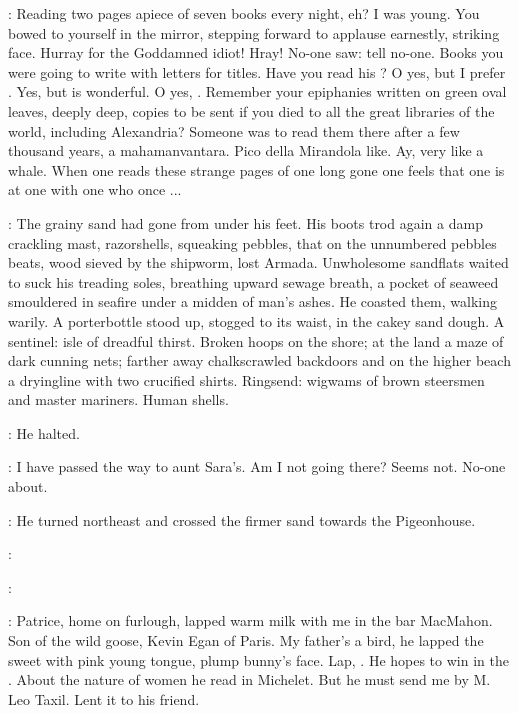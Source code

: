 \StephenInt:
Reading two pages apiece of seven books every night, eh?
I was young.
You bowed to yourself in the mirror,
stepping forward to applause earnestly, striking face.
Hurray for the Goddamned idiot!
Hray!
No-one saw:
tell no-one.
Books you were going to write with letters for titles.
Have you read his ?
O yes, but I prefer .
Yes, but  is wonderful.
O yes, .
Remember your epiphanies written on green oval leaves,
deeply deep,
copies to be sent if you died to all the great libraries of the world,
including Alexandria?
Someone was to read them there after a few thousand years,
a mahamanvantara.
Pico della Mirandola like.
Ay, very like a whale.
When one reads these strange pages of one long gone
one feels that one is at one with one who once ...

:
The grainy sand had gone from under his feet.
His boots trod again a damp crackling mast,
razorshells, squeaking pebbles,
that on the unnumbered pebbles beats,
wood sieved by the shipworm,
lost Armada.
Unwholesome sandflats waited to suck his treading soles,
breathing upward sewage breath,
a pocket of seaweed smouldered in seafire under a midden of man's ashes.
He coasted them, walking warily.
A porterbottle stood up,
stogged to its waist, in the cakey sand dough.
A sentinel:
isle of dreadful thirst.
Broken hoops on the shore;
at the land a maze of dark cunning nets;
farther away chalkscrawled backdoors
and on the higher beach
a dryingline with two crucified shirts.
Ringsend:
wigwams of brown steersmen and master mariners.
Human shells.

:
He halted.

\StephenInt:
I have passed the way to aunt Sara's.
Am I not going there?
Seems not.
No-one about.

:
He turned northeast and crossed the firmer sand
towards the Pigeonhouse.

\patrice:

\Stephen:

\StephenInt:
Patrice, home on furlough, lapped warm milk with me in the bar MacMahon.
Son of the wild goose, Kevin Egan of Paris.
My father's a bird,
he lapped the sweet  with pink young tongue,
plump bunny's face.
Lap, .
He hopes to win in the .
About the nature of women he read in Michelet.
But he must send me  by M. Leo Taxil.
Lent it to his friend.

